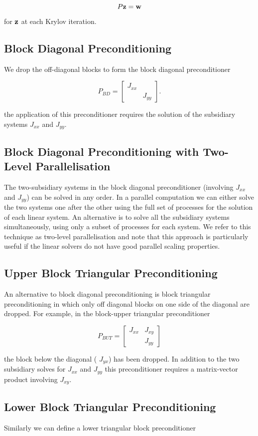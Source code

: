 \[ P{\bf z}={\bf w} \]

for $\bf z$ at each Krylov iteration.\hypertarget{index_block_diagonal}{}\subsection{Block Diagonal Preconditioning}\label{index_block_diagonal}
We drop the off-\/diagonal blocks to form the block diagonal preconditioner

\[ P_{BD}=\left[ \begin{array}{cc} J_{xx}&\\ &J_{yy} \end{array} \right]. \]

the application of this preconditioner requires the solution of the subsidiary systems $J_{xx}$ and $J_{yy}$.\hypertarget{index_two_level_block_diagonal}{}\subsection{Block Diagonal Preconditioning with Two-\/\+Level Parallelisation}\label{index_two_level_block_diagonal}
The two-\/subsidiary systems in the block diagonal preconditioner (involving $J_{xx}$ and $J_{yy}$) can be solved in any order. In a parallel computation we can either solve the two systems one after the other using the full set of processes for the solution of each linear system. An alternative is to solve all the subsidiary systems simultaneously, using only a subset of processes for each system. We refer to this technique as two-\/level parallelisation and note that this approach is particularly useful if the linear solvers do not have good parallel scaling properties.\hypertarget{index_upper_block_triangular}{}\subsection{Upper Block Triangular Preconditioning}\label{index_upper_block_triangular}
An alternative to block diagonal preconditioning is block triangular preconditioning in which only off diagonal blocks on one side of the diagonal are dropped. For example, in the block-\/upper triangular preconditioner

\[ P_{BUT}=\left[ \begin{array}{cc} J_{xx}&J_{xy}\\ &J_{yy} \end{array} \right] \]

the block below the diagonal ( $J_{yx}$) has been dropped. In addition to the two subsidiary solves for $J_{xx}$ and $J_{yy}$ this preconditioner requires a matrix-\/vector product involving $J_{xy}$.\hypertarget{index_lower_block_triangular}{}\subsection{Lower Block Triangular Preconditioning}\label{index_lower_block_triangular}
Similarly we can define a lower triangular block preconditioner

